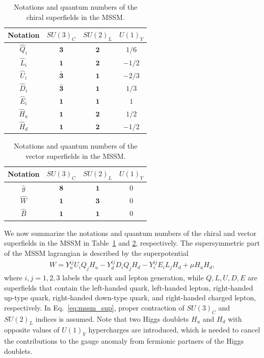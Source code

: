 \documentclass[12pt,twoside,book]{article}
\begin{document}
\begin{table}[t]
  \centering
  \begin{tabular}{c|ccc}
    Notation & $SU(3)_C$ & $SU(2)_L$ & $U(1)_Y$ \\ \hline
    $\hat{Q}_i$ & $\bm{3}$ & $\bm{2}$ & $1/6$ \\
    $\hat{L}_i$ & $\bm{1}$ & $\bm{2}$ & $-1/2$ \\
    $\hat{U}_i$ & $\bar{\bm{3}}$ & $\bm{1}$ & $-2/3$ \\
    $\hat{D}_i$ & $\bar{\bm{3}}$ & $\bm{1}$ & $1/3$ \\
    $\hat{E}_i$ & $\bm{1}$ & $\bm{1}$ & $1$ \\
    $\hat{H}_u$ & $\bm{1}$ & $\bm{2}$ & $1/2$ \\
    $\hat{H}_d$ & $\bm{1}$ & $\bm{2}$ & $-1/2$
  \end{tabular}
  \caption{Notations and quantum numbers of the chiral superfields in the MSSM.}
  \label{tab:mssm_csf}
\end{table}

\begin{table}[t]
  \centering
  \begin{tabular}{c|ccc}
    Notation & $SU(3)_C$ & $SU(2)_L$ & $U(1)_Y$ \\ \hline
    $\hat{g}$ & $\bm{8}$ & $\bm{1}$ & $0$ \\
    $\hat{W}$ & $\bm{1}$ & $\bm{3}$ & $0$ \\
    $\hat{B}$ & $\bm{1}$ & $\bm{1}$ & $0$ \\
  \end{tabular}
  \caption{Notations and quantum numbers of the vector superfields in the MSSM.}
  \label{tab:mssm_vsf}
\end{table}

We now summarize the notations and quantum numbers of the chiral and vector superfields in the MSSM in Table~\ref{tab:mssm_csf} and \ref{tab:mssm_vsf}, respectively.
The supersymmetric part of the MSSM lagrangian is described by the superpotential
\begin{align}
  W = Y_u^{i j} U_i Q_j H_u - Y_d^{i j} D_i Q_j H_d
  - Y_e^{i j} E_i L_j H_d + \mu H_u H_d,
  \label{eq:mssm_sup}
\end{align}
where $i,j=1,2,3$ labels the quark and lepton generation, while $Q, L, U, D, E$ are superfields that contain the left-handed quark, left-handed lepton, right-handed up-type quark, right-handed down-type quark, and right-handed charged lepton, respectively.
In Eq.~\eqref{eq:mssm_sup}, proper contraction of $SU(3)_C$ and $SU(2)_L$ indices is assumed.
Note that two Higgs doublets $H_u$ and $H_d$ with opposite values of $U(1)_Y$ hypercharges are introduced, which is needed to cancel the contributions to the gauge anomaly from fermionic partners of the Higgs doublets.
\end{document}
